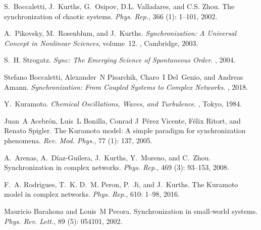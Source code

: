 S.~Boccaletti, J.~Kurths, G.~Osipov, D.L. Valladares, and C.S. Zhou.
\newblock The synchronization of chaotic systems.
\newblock \emph{Phys. Rep.}, 366 (1): 1--101, 2002.

A.~Pikovsky, M.~Rosenblum, and J.~Kurths.
\newblock \emph{Synchronization: {{A}} Universal Concept in Nonlinear
    Sciences}, volume~12.
, {Cambridge}, 2003.

S.~H. Strogatz.
\newblock \emph{Sync: {{The}} Emerging Science of Spontaneous Order}.
, 2004.

Stefano Boccaletti, Alexander~N Pisarchik, Charo~I Del~Genio, and Andreas
Amann.
\newblock \emph{Synchronization: From Coupled Systems to Complex Networks}.
, 2018.

Y.~Kuramoto.
\newblock \emph{Chemical Oscillations, Waves, and Turbulence}.
, {Tokyo}, 1984.

Juan~A Acebr{\'o}n, Luis~L Bonilla, Conrad J~P{\'e}rez Vicente, F{\'e}lix
Ritort, and Renato Spigler.
\newblock The {{Kuramoto}} model: {{A}} simple paradigm for synchronization
phenomena.
\newblock \emph{Rev. Mod. Phys.}, 77 (1): 137, 2005.

A.~Arenas, A.~{D{\'i}az-Guilera}, J.~Kurths, Y.~Moreno, and C.~Zhou.
\newblock Synchronization in complex networks.
\newblock \emph{Phys. Rep.}, 469 (3): 93--153, 2008.

F.~A. Rodrigues, T.~K. D.~M. Peron, P.~Ji, and J.~Kurths.
\newblock The {{Kuramoto}} model in complex networks.
\newblock \emph{Phys. Rep.}, 610: 1--98, 2016.

Mauricio Barahona and Louis~M Pecora.
\newblock Synchronization in small-world systems.
\newblock \emph{Phys. Rev. Lett.}, 89 (5): 054101, 2002.

